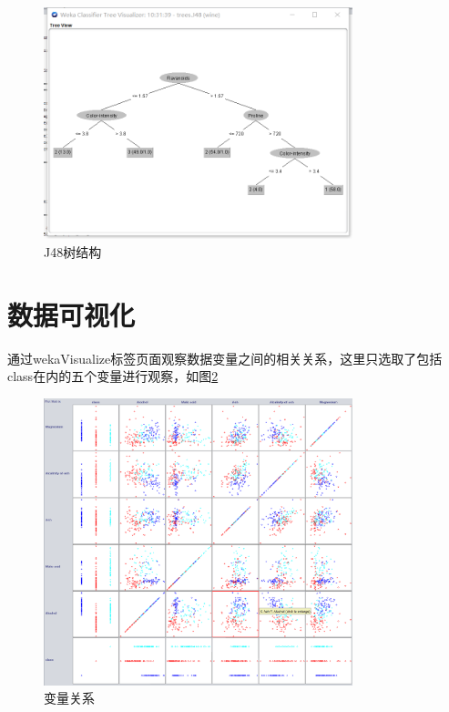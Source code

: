 \documentclass{xcumcmart}
\begin{document}
\begin{figure}[htbp]
	\centering
	\includegraphics[width=0.8\textwidth]{fig/model_j48.png}
    \caption{J48树结构\label{fig:fg6}}
\end{figure}
\section{数据可视化}
通过wekaVisualize标签页面观察数据变量之间的相关关系，这里只选取了包括class在内的五个变量进行观察，如图\ref{fig:fg7}
\begin{figure}[htbp]
	\centering
	\includegraphics[width=0.8\textwidth]{fig/vis_all.png}
    \caption{变量关系\label{fig:fg7}}
\end{figure}
\end{document}
